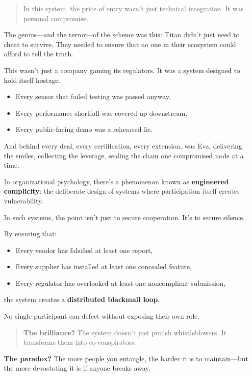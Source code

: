 \begin{quote}
In this system, the price of entry wasn’t just technical integration.
It was personal compromise.
\end{quote}

The genius—and the terror—of the scheme was this: Titan didn’t just need to cheat to survive.  They needed to ensure that no one in their ecosystem could afford to tell the truth.

This wasn’t just a company gaming its regulators.  It was a system designed to hold itself hostage.

\begin{itemize}
\item Every sensor that failed testing was passed anyway.
\item Every performance shortfall was covered up downstream.
\item Every public-facing demo was a rehearsed lie.
\end{itemize}

And behind every deal,
every certification,
every extension,
was Eva,
delivering the smiles,
collecting the leverage,
sealing the chain one compromised node at a time.

\begin{tcolorbox}[colback=blue!5!white, colframe=blue!50!black, breakable,
title={Psychological Sidebar: Engineered Complicity — When Risk Is a Prerequisite}]

In organizational psychology, there’s a phenomenon known as \textbf{engineered complicity}:
the deliberate design of systems where participation itself creates vulnerability.

\medskip

In such systems, the point isn’t just to secure cooperation.
It’s to secure silence.

\medskip

By ensuring that:
\begin{itemize}
\item Every vendor has falsified at least one report,
\item Every supplier has installed at least one concealed feature,
\item Every regulator has overlooked at least one noncompliant submission,
\end{itemize}
the system creates a \textbf{distributed blackmail loop}.

\medskip

No single participant can defect without exposing their own role.

\begin{quote}
\textbf{The brilliance?}
The system doesn’t just punish whistleblowers.
It transforms them into co-conspirators.
\end{quote}

\medskip

\textbf{The paradox?}
The more people you entangle,
the harder it is to maintain—but the more devastating it is if anyone breaks away.

\end{tcolorbox}




